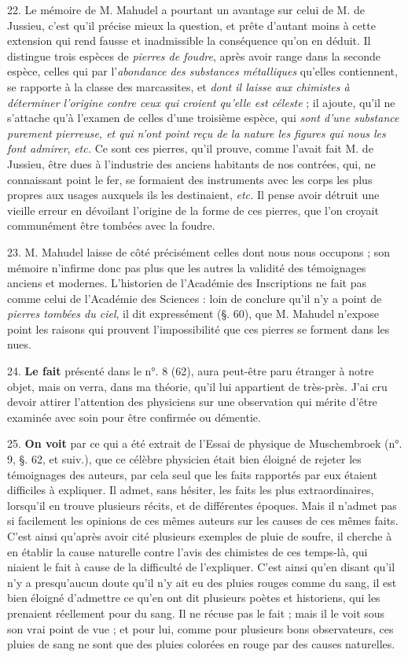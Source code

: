 \documentclass[a4paper, 11pt, oneside, polutonikogreek, french]{article}
\begin{document}
22. Le mémoire de M. Mahudel a pourtant un avantage sur celui de M. de Jussieu, c'est qu'il précise mieux la question, et prête d'autant moins à cette extension qui rend fausse et inadmissible la conséquence qu'on en déduit. Il distingue trois espèces de \emph{pierres de foudre}, après avoir range dans la seconde espèce, \og celles qui par l'\emph{abondance des substances métalliques} qu'elles contiennent, se rapporte à la classe des marcassites, et \emph{dont il laisse aux chimistes à déterminer l'origine contre ceux qui croient qu'elle est céleste} \fg ; il ajoute, \og qu'il ne s'attache qu'à l'examen de celles d'une troisième espèce, qui \emph{sont d'une substance purement pierreuse, et qui n'ont point reçu de la nature les figures qui nous les font admirer}, \emph{etc.} \fg Ce sont ces pierres, qu'il prouve, comme l'avait fait M. de Jussieu, être dues à l'industrie des anciens habitants de nos contrées, qui, ne connaissant point le fer, se formaient des instruments avec les corps les plus propres aux usages auxquels ils les destinaient, \emph{etc.} Il pense avoir détruit une vieille erreur en dévoilant l'origine de la forme de ces pierres, que l'on croyait communément être tombées avec la foudre.

23. M. Mahudel laisse de côté précisément celles dont nous nous occupons ; son mémoire n'infirme donc pas plus que les autres la validité des témoignages anciens et modernes. L'historien de l'Académie des Inscriptions ne fait pas comme celui de l'Académie des Sciences : loin de conclure qu'il n'y a point de \emph{pierres tombées du ciel}, il dit expressément (§. 60), \og que M. Mahudel n'expose point les raisons qui prouvent l'impossibilité que ces pierres se forment dans les nues. \fg

24. \textbf{Le fait} présenté dans le n°. 8 (62), aura peut-être paru étranger à notre objet, mais on verra, dans ma théorie, qu'il lui appartient de très-près. J'ai cru devoir attirer l'attention des physiciens sur une observation qui mérite d'être examinée avec soin pour être confirmée ou démentie.

25. \textbf{On voit} par ce qui a été extrait de l'Essai de physique de Muschembroek (n°. 9, §. 62, et suiv.), que ce célèbre physicien était bien éloigné de rejeter les témoignages des auteurs, par cela seul que les faits rapportés par eux étaient difficiles à expliquer. Il admet, sans hésiter, les faits les plus extraordinaires, lorsqu'il en trouve plusieurs récits, et de différentes époques. Mais il n'admet pas si facilement les opinions de ces mêmes auteurs sur les causes de ces mêmes faits. C'est ainsi qu'après avoir cité plusieurs exemples de pluie de soufre, il cherche à en établir la cause naturelle contre l'avis des chimistes de ces temps-là, qui niaient le fait à cause de la difficulté de l'expliquer. C'est ainsi qu'en disant qu'il n'y a presqu'aucun doute qu'il n'y ait eu des pluies rouges comme du sang, il est bien éloigné d'admettre ce qu'en ont dit plusieurs poètes et historiens, qui les prenaient réellement pour du sang. Il ne récuse pas le fait ; mais il le voit sous son vrai point de vue ; et pour lui, comme pour plusieurs bons observateurs, ces pluies de sang ne sont que des pluies colorées en rouge par des causes naturelles.
\end{document}
